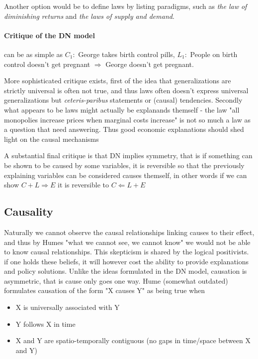 \documentclass[12pt, a4paper]{article}
\begin{document}
\begin{multicols}{2}
Another option would be to define laws by listing paradigms, such as \textit{the law of diminishing returns} and \textit{the laws of supply and demand}.

\paragraph{Critique of the DN model} can be as simple as $C_1:$ George takes birth control pills, $L_1:$ People on birth control doesn't get pregnant $\Rightarrow$ George doesn't get pregnant.

More sophisticated critique exists, first of the idea that generalizations are strictly universal is often not true, and thus laws often doesn't express universal generalizations but \textit{ceteris-paribus} statements or (causal) tendencies. Secondly what appears to be laws might actually be explanands themself - the law "all monopolies increase prices when marginal costs increase" is not so much a law as a question that need answering. Thus good economic explanations should shed light on the causal mechanisms 

A substantial final critique is that DN implies symmetry, that is if something can be shown to be caused by some variables, it is reversible so that the previously explaining variables can be considered causes themself, in other words if we can show $C+L \Rightarrow E$ it is reversible to $C \Leftarrow L + E$
\subsection{Causality} \label{seq: causality}
Naturally we cannot observe the causal relationships linking causes to their effect, and thus by Humes "what we cannot see, we cannot know" we would not be able to know causal relationships. This skepticism is shared by the logical positivists. if one holds these beliefs, it will however cost the ability to provide explanations and policy solutions. 
Unlike the ideas formulated in the DN model, causation is asymmetric, that is cause only goes one way. Hume (somewhat outdated) formulates causation of the form "X causes Y" as being true when
\begin{itemize}
\item X is universally associated with Y
\item Y follows X in time
\item X and Y are spatio-temporally contiguous (no gaps in time/space between X and Y)
\end{itemize}

\end{multicols}
\end{document}
